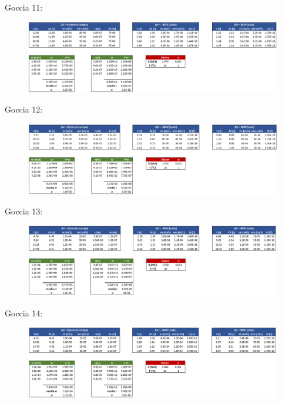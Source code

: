 \documentclass{article}
\begin{document}
Goccia 11:

\begin{figure}[h]
\centering
\includegraphics[width=\linewidth]{Goccia11}
\end{figure}

\pagebreak

Goccia 12:

\begin{figure}[h]
\centering
\includegraphics[width=\linewidth]{Goccia12}
\end{figure}

\vspace{10mm}

Goccia 13:

\begin{figure}[h]
\centering
\includegraphics[width=\linewidth]{Goccia13}
\end{figure}

\vspace{10mm}

Goccia 14:

\begin{figure}[h]
\centering
\includegraphics[width=\linewidth]{Goccia14}
\end{figure}
\end{document}
